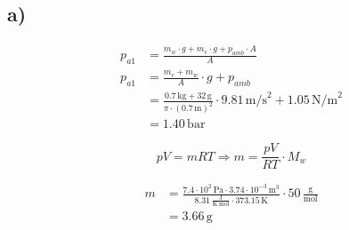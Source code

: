 

\subsection*{a)}

\begin{align*}
p_{a1} &= \frac{m_w \cdot g + m_e \cdot g + p_{amb} \cdot A}{A} \\
p_{a1} &= \frac{m_e + m_w}{A} \cdot g + p_{amb} \\
&= \frac{0.7 \, \text{kg} + 32 \, \text{g}}{\pi \cdot (0.7 \, \text{m})^2} \cdot 9.81 \, \text{m/s}^2 + 1.05 \, \text{N/m}^2 \\
&= 1.40 \, \text{bar}
\end{align*}

\[
pV = mRT \Rightarrow m = \frac{pV}{RT} \cdot M_w
\]

\begin{align*}
m &= \frac{7.4 \cdot 10^2 \, \text{Pa} \cdot 3.74 \cdot 10^{-3} \, \text{m}^3}{8.31 \, \frac{\text{J}}{\text{K} \cdot \text{mol}} \cdot 373.15 \, \text{K}} \cdot 50 \, \frac{\text{g}}{\text{mol}} \\
&= 3.66 \, \text{g}
\end{align*}